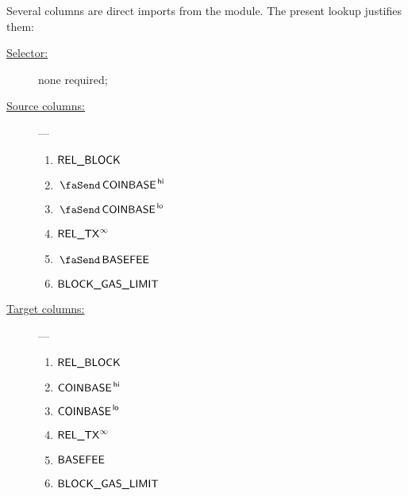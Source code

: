 Several columns are direct imports from the \btcMod{} module.
The present lookup justifies them:
\begin{description}
	\item[\underline{Selector:}] none required;
	\item[\underline{Source columns:}] ---
		\begin{multicols}{2}
			\begin{enumerate}
				\item $\textsf{REL\_BLOCK}$
				\item $\txCoinbase\high$
				\item $\txCoinbase\low$
				\item $\textsf{REL\_TX}^\infty$
				\item $\txBasefee$
				\item $\textsf{BLOCK\_GAS\_LIMIT}$
			\end{enumerate}
		\end{multicols}
	\item[\underline{Target columns:}] ---
		\begin{multicols}{2}
			\begin{enumerate}
				\item $\textsf{REL\_BLOCK}$
				\item $\textsf{COINBASE}^{\mathsf{\,hi}}$
				\item $\textsf{COINBASE}^{\mathsf{\,lo}}$
				\item $\textsf{REL\_TX}^\infty$
				\item $\textsf{BASEFEE}$
				\item $\textsf{BLOCK\_GAS\_LIMIT}$
			\end{enumerate}
		\end{multicols}
\end{description}
